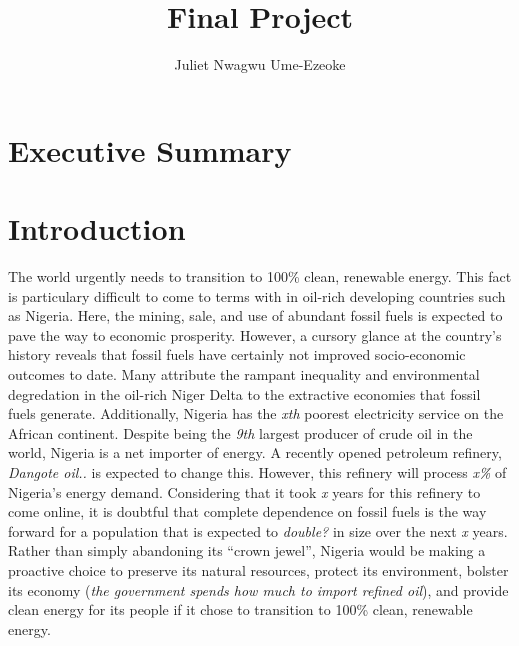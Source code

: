 \documentclass[
  letterpaper,
  DIV=11,
  numbers=noendperiod]{scrartcl}
\title{Final Project}
\author{Juliet Nwagwu Ume-Ezeoke}
\date{}
\renewcommand*\contentsname{Table of contents}
\newcommand\contentsname{Table of contents}
\begin{document}
\maketitle
\ifdefined\Shaded\renewenvironment{Shaded}{\begin{tcolorbox}[sharp corners, interior hidden, boxrule=0pt, frame hidden, enhanced, breakable, borderline west={3pt}{0pt}{shadecolor}]}{\end{tcolorbox}}\fi

\renewcommand*\contentsname{Table of contents}
{
\hypersetup{linkcolor=}
\setcounter{tocdepth}{3}
\tableofcontents
}
\hypertarget{executive-summary}{%
\section{Executive Summary}\label{executive-summary}}

\hypertarget{introduction}{%
\section{Introduction}\label{introduction}}

The world urgently needs to transition to 100\% clean, renewable energy.
This fact is particulary difficult to come to terms with in oil-rich
developing countries such as Nigeria. Here, the mining, sale, and use of
abundant fossil fuels is expected to pave the way to economic
prosperity. However, a cursory glance at the country's history reveals
that fossil fuels have certainly not improved socio-economic outcomes to
date. Many attribute the rampant inequality and environmental
degredation in the oil-rich Niger Delta to the extractive economies that
fossil fuels generate. Additionally, Nigeria has the \emph{xth} poorest
electricity service on the African continent. Despite being the
\emph{9th} largest producer of crude oil in the world, Nigeria is a net
importer of energy. A recently opened petroleum refinery, \emph{Dangote
oil..} is expected to change this. However, this refinery will process
\emph{x\%} of Nigeria's energy demand. Considering that it took \emph{x}
years for this refinery to come online, it is doubtful that complete
dependence on fossil fuels is the way forward for a population that is
expected to \emph{double?} in size over the next \emph{x} years. Rather
than simply abandoning its ``crown jewel'', Nigeria would be making a
proactive choice to preserve its natural resources, protect its
environment, bolster its economy (\emph{the government spends how much
to import refined oil}), and provide clean energy for its people if it
chose to transition to 100\% clean, renewable energy.
\end{document}
